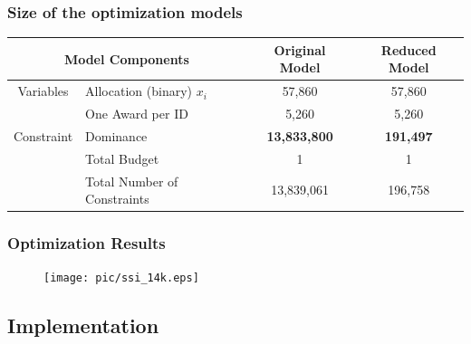 \documentclass[aspectratio=169]{beamer}
\begin{document}
\begin{frame}
\frametitle{Size of the optimization models}

\centering
\small{
\begin{tabular}{|c|l|c|c|}
\hline %
\multicolumn{2}{|c|}{Model Components}   &
Original Model & Reduced Model \\ \hline
Variables                   & \multicolumn{1}{|l|}{Allocation (binary) 
$x_i$}
& 57,860         & 57,860        \\ \hline
\multirow{3}{*}{Constraint} & One Award per ID         &
5,260          & 5,260         \\ \cline{2-4}
& Dominance                & \textbf{13,833,800}    & \textbf{191,497}
\\ \cline{2-4}
& Total Budget              & 1              & 1
\\ \cline{2-4}
& Total Number of Constraints     & 13,839,061     & 196,758
\\ \hline
\end{tabular}
}


\end{frame}



%
%


\begin{frame}
\frametitle{Optimization Results}
\begin{figure}
    \centering
  \texttt{[image: pic/ssi\_14k.eps]}
\end{figure}


\end{frame}

\subsection{Implementation}
\end{document}
